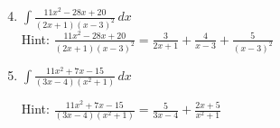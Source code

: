 \documentclass[12pt]{article}
\newif\ifans
\begin{document}
\begin{enumerate}
\setcounter{enumi}{3}

\item $\int \frac{11x^2-28x+20}{(2x+1)(x-3)^2} \,dx$\\

Hint: $\frac{11x^2-28x+20}{(2x+1)(x-3)^2} = \frac{3}{2x+1}+\frac{4}{x-3}+\frac{5}{(x-3)^2}$

\ifans{\fbox{$\frac{3}{2}\ln{|2x+1|}+4\ln{|x-3|}-\frac{5}{(x-3)}+C$}} \fi

\item $\int \frac{11x^2+7x-15}{(3x-4)(x^2+1)} \,dx$

Hint: $\frac{11x^2+7x-15}{(3x-4)(x^2+1)} = \frac{5}{3x-4}+\frac{2x+5}{x^2+1}$

\ifans{\fbox{$\frac{5}{3}\ln{|3x-4|}+\ln(x^2+1)+5\tan^{-1}{x}+C$}} \fi

\end{enumerate}

\end{document}
